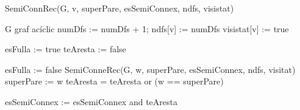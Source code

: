 \documentclass[a4paper,12pt]{article}
\begin{document}
\begin{algorithm}[H]
    \caption{SemiConnRec(G, v, superPare, esSemiConnex, ndfs, visistat)}
    \begin{algorithmic}[1]  %
        \Require G graf acíclic
        \State numDfs := numDfs + 1; ndfs[v] := numDfs
        \State visistat[v] := true

        \State esFulla := true
        \State teAresta := false

        \State
        
                \State esFulla := false
                \State SemiConneRec(G, w, superPare, esSemiConnex, ndfs, visitat)
                \State superPare := w
            \Else
                \State teAresta = teAresta or (w == superPare)
            \EndIf
        \EndFor
        
        \State

            \State  esSemiConnex := esSemiConnex and teAresta
        \EndIf

    \end{algorithmic}
\end{algorithm}


\newpage
\end{document}
